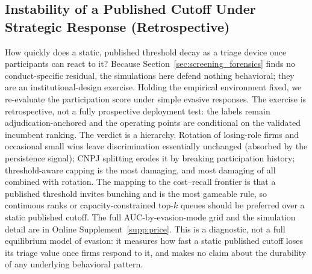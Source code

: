 \subsection{Instability of a Published Cutoff Under Strategic Response (Retrospective)}
\label{app:strategic_adaptation_submission}

How quickly does a static, published threshold decay as a triage device
once participants can react to it? Because Section~\ref{sec:screening_forensics}
finds no conduct-specific residual, the simulations here defend nothing
behavioral; they are an institutional-design exercise. Holding the
empirical environment fixed, we re-evaluate the participation score under
simple evasive responses. The exercise is retrospective, not a fully
prospective deployment test: the labels remain adjudication-anchored and
the operating points are conditional on the validated incumbent ranking.
The verdict is a hierarchy. Rotation of losing-role firms and occasional
small wins leave discrimination essentially unchanged (absorbed by the
persistence signal); CNPJ splitting erodes it by breaking participation
history; threshold-aware capping is the most damaging, and most damaging of
all combined with rotation. The mapping to the cost--recall frontier is
that a published threshold invites bunching and is the most gameable rule,
so continuous ranks or capacity-constrained top-$k$ queues should be
preferred over a static published cutoff. The full AUC-by-evasion-mode grid
and the simulation detail are in Online Supplement~\ref{supp:price}. This is a
diagnostic, not a full equilibrium
model of evasion: it measures how fast a static published cutoff loses its
triage value once firms respond to it, and makes no claim about the
durability of any underlying behavioral pattern.
